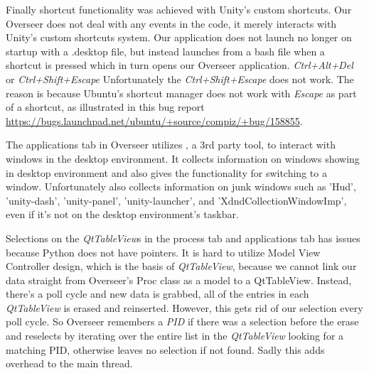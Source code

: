 \documentclass[12pt]{article}
\begin{document}
Finally shortcut functionality was achieved with Unity's custom shortcuts.
Our Overseer does not deal with any events in the code, it merely interacts with Unity's custom shortcuts system.
Our application does not launch no longer on startup with a .desktop file, but instead launches from a bash file when a shortcut is pressed which in turn opens our Overseer application.
\emph{Ctrl+Alt+Del} or \emph{Ctrl+Shift+Escape}
Unfortunately the \emph{Ctrl+Shift+Escape} does not work.
The reason is because Ubuntu's shortcut manager does not work with \emph{Escape} as part of a shortcut, as illustrated in this bug report \url{https://bugs.launchpad.net/ubuntu/+source/compiz/+bug/158855}.

The applications tab in Overseer utilizes \cite{wmtrl}, a 3rd party tool, to interact with windows in the desktop environment.
It collects information on windows showing in desktop environment and also gives the functionality for switching to a window.
Unfortunately  also collects information on junk windows such as 'Hud', 'unity-dash', 'unity-panel', 'unity-launcher', and 'XdndCollectionWindowImp', even if it's not on the desktop environment's taskbar.

Selections on the \emph{QtTableView}s in the process tab and applications tab has issues because Python does not have pointers.
It is hard to utilize Model View Controller design, which is the basis of \emph{QtTableView}, because we cannot link our data straight from Overseer's Proc class as a model to a QtTableView.
Instead, there's a poll cycle and new data is grabbed, all of the entries in each \emph{QtTableView} is erased and reinserted.
However, this gets rid of our selection every poll cycle. 
So Overseer remembers a \emph{PID} if there was a selection before the erase and reselects by iterating over the entire list in the \emph{QtTableView} looking for a matching PID, otherwise leaves no selection if not found.
Sadly this adds overhead to the main thread.	
\end{document}
